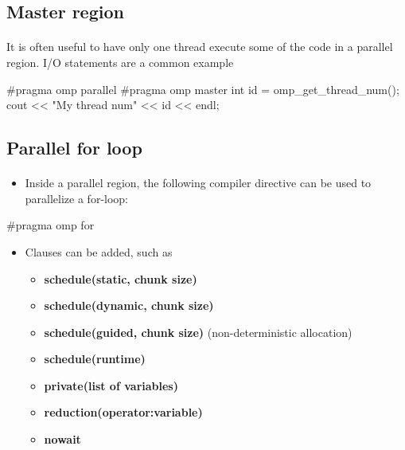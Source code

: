 \documentclass[%
oneside,                 %
final,                   %
10pt]{article}
\begin{document}
\noindent



\subsection{Master region}

\paragraph{}
It is often useful to have only one thread execute some of the code in a parallel region. I/O statements are a common example









\bcppcod
#pragma omp parallel 
{
  #pragma omp master
   {
      int id = omp_get_thread_num();
      cout << "My thread num" << id << endl; 
   } 
}

\ecppcod



\subsection{Parallel for loop}

\paragraph{}
\begin{itemize}
 \item Inside a parallel region, the following compiler directive can be used to parallelize a for-loop:
\end{itemize}

\noindent


\bcppcod
#pragma omp for

\ecppcod

\begin{itemize}
\item Clauses can be added, such as
\begin{itemize}

  \item \textbf{schedule(static, chunk size)}

  \item \textbf{schedule(dynamic, chunk size)} 

  \item \textbf{schedule(guided, chunk size)} (non-deterministic allocation)

  \item \textbf{schedule(runtime)}

  \item \textbf{private(list of variables)}

  \item \textbf{reduction(operator:variable)}

  \item \textbf{nowait}
\end{itemize}

\noindent
\end{itemize}
\end{document}
